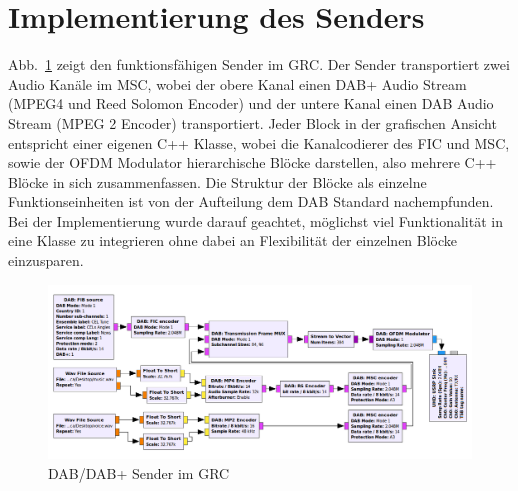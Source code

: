 \section{Implementierung des Senders}
\label{sec:imp_des_transmitters}
Abb.~\ref{fig:transmitter} zeigt den funktionsfähigen Sender im GRC. Der Sender transportiert zwei Audio Kanäle im MSC, wobei der obere Kanal einen DAB+ Audio Stream (MPEG4 und Reed Solomon Encoder) und der untere Kanal einen DAB Audio Stream (MPEG 2 Encoder) transportiert. Jeder Block in der grafischen Ansicht entspricht einer eigenen C++ Klasse, wobei die Kanalcodierer des FIC und MSC, sowie der OFDM Modulator hierarchische Blöcke darstellen, also mehrere C++ Blöcke in sich zusammenfassen. Die Struktur der Blöcke als einzelne Funktionseinheiten ist von der Aufteilung dem DAB Standard nachempfunden. Bei der Implementierung wurde darauf geachtet, möglichst viel Funktionalität in eine Klasse zu integrieren ohne dabei an Flexibilität der einzelnen Blöcke einzusparen.

\begin{figure}[ht]
\centering
  \includegraphics[width=\textwidth]{figures/GRC_transmitter.png}
	\caption{DAB/DAB+ Sender im GRC}
	\label{fig:transmitter}
\end{figure}

